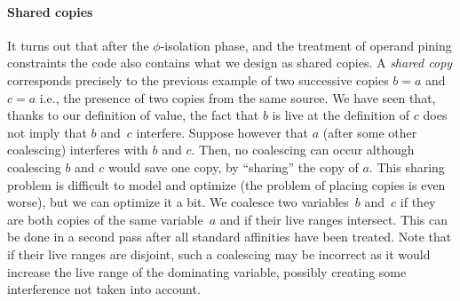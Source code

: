 \paragraph{Shared copies}
It turns out that after the $\phi$-isolation phase, and the treatment of operand pining constraints the code also contains what we design as shared copies. A \emph{shared copy} corresponds precisely to the previous example of two successive copies $b=a$ and $c=a$ i.e., the presence of two copies from the same source. 
We have seen that, thanks to our
definition of value, the fact that $b$ is live at the definition of $c$ does
not imply that $b$ and~$c$ interfere.  Suppose however that $a$ (after some
other coalescing) interferes with $b$ and $c$. Then, no coalescing can occur
although coalescing $b$ and $c$ would save one copy, by ``sharing'' the copy of
$a$.  This sharing problem is difficult to model
and optimize (the problem of placing copies is even worse), but we can optimize
it a bit. We coalesce two variables~$b$ and~$c$ if they are both copies of the
same variable~$a$ and if their live ranges intersect. This can be done in a second pass after all standard affinities have been treated. Note that if their live
ranges are disjoint, such a coalescing may be incorrect as it would increase
the live range of the dominating variable, possibly creating some interference
not taken into account.



